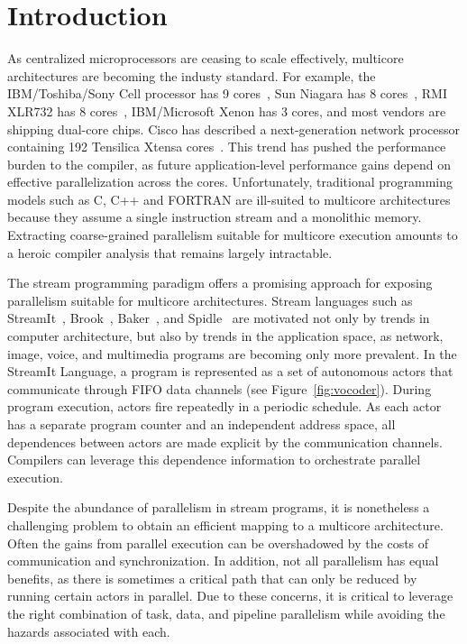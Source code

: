 \section{Introduction}


As centralized microprocessors are ceasing to scale effectively,
multicore architectures are becoming the industy standard.  For
example, the IBM/Toshiba/Sony Cell processor has 9 cores~\cite{Cell-hpca}, Sun
Niagara has 8 cores~\cite{Niagara}, RMI XLR732 has 8 cores~\cite{RMI-web},
IBM/Micro\-soft Xenon has 3 cores, and most vendors are shipping
dual-core chips.  Cisco has described a next-generation network
processor containing 192 Tensilica Xtensa cores~\cite{etherton05ancs}.
This trend has pushed the performance burden to the compiler, as
future application-level performance gains depend on effective
parallelization across the cores.  Unfortunately, traditional
programming models such as C, C++ and FORTRAN are ill-suited to
multicore architectures because they assume a single instruction
stream and a monolithic memory.  Extracting coarse-grained parallelism
suitable for multicore execution amounts to a heroic compiler analysis
that remains largely intractable.

The stream programming paradigm offers a promising approach for
exposing parallelism suitable for multicore architectures.  Stream
languages such as StreamIt~\cite{streamitcc}, Brook~\cite{brook04},
Baker~\cite{Baker}, and Spidle~\cite{spidle02} are motivated not only by
trends in computer architecture, but also by trends in the application
space, as network, image, voice, and multimedia programs are becoming
only more prevalent.  In the StreamIt Language, a program is represented
as a set of autonomous actors that communicate through FIFO data
channels (see Figure~\ref{fig:vocoder}).  During program execution,
actors fire repeatedly in a periodic schedule.  As each actor has a
separate program counter and an independent address space, all
dependences between actors are made explicit by the communication
channels.  Compilers can leverage this dependence information to
orchestrate parallel execution.

Despite the abundance of parallelism in stream programs, it is
nonetheless a challenging problem to obtain an efficient mapping to a
multicore architecture.  Often the gains from parallel execution can
be overshadowed by the costs of communication and synchronization.  In
addition, not all parallelism has equal benefits, as there is
sometimes a critical path that can only be reduced by running certain
actors in parallel.  Due to these concerns, it is critical to leverage
the right combination of task, data, and pipeline parallelism while
avoiding the hazards associated with each.

